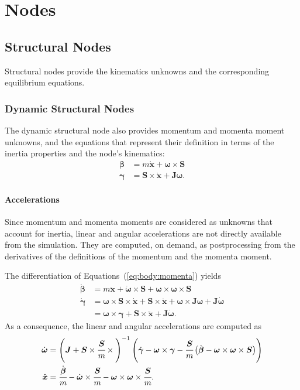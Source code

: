 \documentclass[10pt,dvips,fleqn,subeqn]{report}
\newcommand{\T}[1]{\boldsymbol{#1}}
\newcommand{\TT}[1]{\boldsymbol{#1}}
\begin{document}
\chapter{Nodes}

\section{Structural Nodes}
Structural nodes provide the kinematics unknowns
and the corresponding equilibrium equations.

\subsection{Dynamic Structural Nodes}
The dynamic structural node also provides momentum and momenta moment
unknowns, and the equations that represent their definition
in terms of the inertia properties and the node's kinematics:
\begin{subequations}
\label{eq:body:momenta}
\begin{align}
	\T{\beta} &= m \dot{\T{x}} + \T{\omega} \times \T{S}
	\label{eq:body:momentum} \\
	\T{\gamma} &= \T{S} \times \dot{\T{x}} + \TT{J} \T{\omega}
	\label{eq:body:momenta-moment} .
\end{align}
\end{subequations}

\subsubsection{Accelerations}
Since momentum and momenta moments are considered as unknowns
that account for inertia, linear and angular accelerations
are not directly available from the simulation.
They are computed, on demand, as postprocessing from the derivatives
of the definitions of the momentum and the momenta moment.

The differentiation of Equations~(\ref{eq:body:momenta}) yields
\begin{subequations}
\begin{align}
	\dot{\T{\beta}} &= m \ddot{\T{x}} + \dot{\T{\omega}} \times \T{S}
		+ \T{\omega} \times \T{\omega} \times \T{S} \\
	\dot{\T{\gamma}} &= \T{\omega}\times \T{S} \times \dot{\T{x}}
		+ \T{S} \times \ddot{\T{x}}
		+ \T{\omega} \times \TT{J} \T{\omega}
		+ \TT{J} \dot{\T{\omega}} \nonumber \\
	&= \T{\omega}\times \T{\gamma}
		+ \T{S} \times \ddot{\T{x}}
		+ \TT{J} \dot{\T{\omega}} .
\end{align}
\end{subequations}
As a consequence, the linear and angular accelerations are computed as
\begin{align}
	\dot{\T{\omega}}
	&= \plbr{\T{J} + \T{S} \times \cfrac{\T{S}}{m} \times{}}^{-1}\plbr{
		\dot{\T{\gamma}} - \T{\omega} \times \T{\gamma}
		- \cfrac{\T{S}}{m} \plbr{
			\dot{\T{\beta}}
			- \T{\omega} \times \T{\omega} \times \T{S}
		}
	} \\
	\ddot{\T{x}}
	&= \cfrac{\dot{\T{\beta}}}{m}
	- \dot{\T{\omega}} \times \cfrac{\T{S}}{m}
	- \T{\omega} \times \T{\omega} \times \cfrac{\T{S}}{m} .
\end{align}
\end{document}
